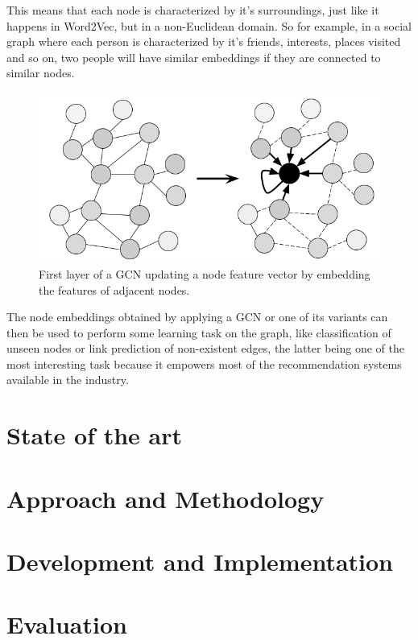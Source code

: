 \documentclass[%
    corpo=13.5pt,
    twoside,
    oldstyle,
    tipotesi=magistrale,
    greek,
    evenboxes
]{toptesi}
\begin{document}
This means that each node is characterized by it's surroundings,
just like it happens in Word2Vec, but in a non-Euclidean domain.
So for example, in a social graph where each person is characterized by it's
friends, interests, places visited and so on, two people will have similar
embeddings if they are connected to similar nodes.


\begin{figure}[h]
    \centering
    \includegraphics[scale=0.4]{img/gcn.png}
    \caption{First layer of a GCN updating a node feature vector by embedding
        the features of adjacent nodes.}
    \label{fig:gcn}
    \end{figure}

The node embeddings obtained by applying a GCN or one of its variants can
then be used to perform some learning task on the graph, like classification
of unseen nodes or link prediction of non-existent edges, the latter being
one of the most interesting task because it empowers most of the
recommendation systems available in the industry.



\chapter{State of the art}

\chapter{Approach and Methodology}

\chapter{Development and Implementation}

\chapter{Evaluation}
\end{document}
